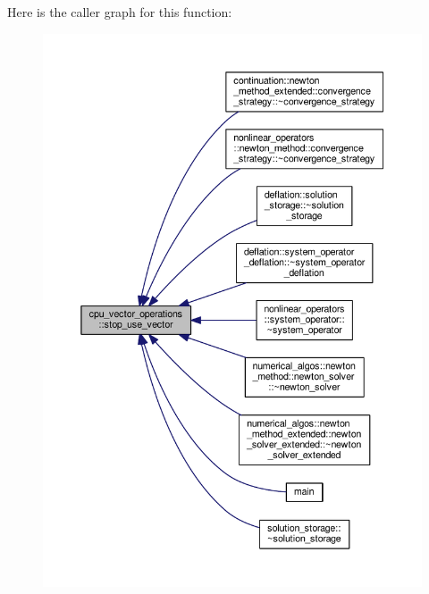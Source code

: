 Here is the caller graph for this function\-:\nopagebreak
\begin{figure}[H]
\begin{center}
\leavevmode
\includegraphics[width=350pt]{structcpu__vector__operations_ab79fb826fdea7cc2a301e9db9bdc705e_icgraph}
\end{center}
\end{figure}




